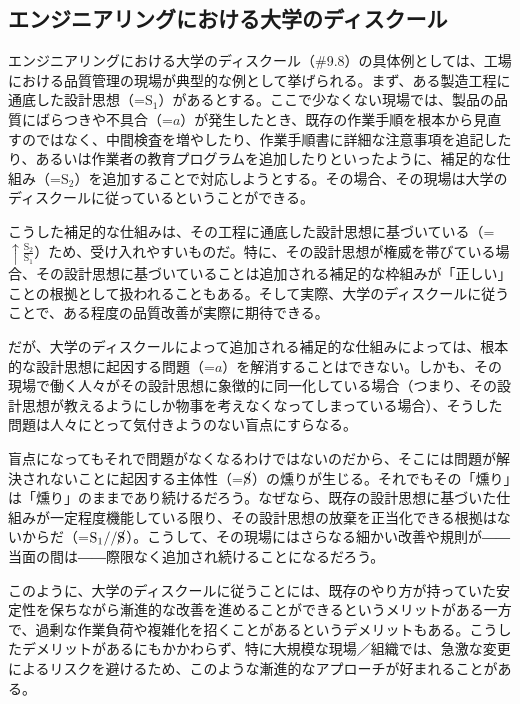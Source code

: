 \subsection{エンジニアリングにおける大学のディスクール}\label{ux30a8ux30f3ux30b8ux30cbux30a2ux30eaux30f3ux30b0ux306bux304aux3051ux308bux5927ux5b66ux306eux30c7ux30a3ux30b9ux30afux30fcux30eb}

エンジニアリングにおける大学のディスクール（\#9.8）の具体例としては、工場における品質管理の現場が典型的な例として挙げられる。まず、ある製造工程に通底した設計思想（=\(\textrm{S}_1\)）があるとする。ここで少なくない現場では、製品の品質にばらつきや不具合（=\(a\)）が発生したとき、既存の作業手順を根本から見直すのではなく、中間検査を増やしたり、作業手順書に詳細な注意事項を追記したり、あるいは作業者の教育プログラムを追加したりといったように、補足的な仕組み（=\(\textrm{S}_2\)）を追加することで対応しようとする。その場合、その現場は大学のディスクールに従っているということができる。

こうした補足的な仕組みは、その工程に通底した設計思想に基づいている（=\(\uparrow\frac{\textrm{S}_2}{\textrm{S}_1}\)）ため、受け入れやすいものだ。特に、その設計思想が権威を帯びている場合、その設計思想に基づいていることは追加される補足的な枠組みが「正しい」ことの根拠として扱われることもある。そして実際、大学のディスクールに従うことで、ある程度の品質改善が実際に期待できる。

だが、大学のディスクールによって追加される補足的な仕組みによっては、根本的な設計思想に起因する問題（=\(a\)）を解消することはできない。しかも、その現場で働く人々がその設計思想に象徴的に同一化している場合（つまり、その設計思想が教えるようにしか物事を考えなくなってしまっている場合）、そうした問題は人々にとって気付きようのない盲点にすらなる。

盲点になってもそれで問題がなくなるわけではないのだから、そこには問題が解決されないことに起因する主体性（=\(\cancel{\textrm{S}}\)）の燻りが生じる。それでもその「燻り」は「燻り」のままであり続けるだろう。なぜなら、既存の設計思想に基づいた仕組みが一定程度機能している限り、その設計思想の放棄を正当化できる根拠はないからだ（=\(\textrm{S}_1//\cancel{\textrm{S}}\)）。こうして、その現場にはさらなる細かい改善や規則が――当面の間は――際限なく追加され続けることになるだろう。

このように、大学のディスクールに従うことには、既存のやり方が持っていた安定性を保ちながら漸進的な改善を進めることができるというメリットがある一方で、過剰な作業負荷や複雑化を招くことがあるというデメリットもある。こうしたデメリットがあるにもかかわらず、特に大規模な現場／組織では、急激な変更によるリスクを避けるため、このような漸進的なアプローチが好まれることがある。

